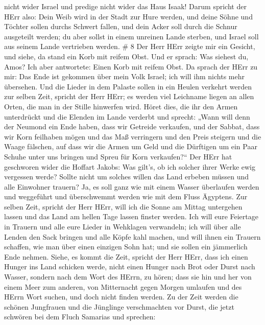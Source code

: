 nicht wider Israel und predige nicht wider das Haus Isaak! 
Darum spricht der HErr also: Dein Weib wird in der Stadt zur Hure
werden, und deine Söhne und Töchter sollen durchs Schwert fallen, und
dein Acker soll durch die Schnur ausgeteilt werden; du aber sollst in
einem unreinen Lande sterben, und Israel soll aus seinem Lande
vertrieben werden. \# 8  Der Herr HErr zeigte mir ein
Gesicht, und siehe, da stand ein Korb mit reifem Obst.  Und
er sprach: Was siehest du, Amos? Ich aber antwortete: Einen Korb mit
reifem Obst. Da sprach der HErr zu mir: Das Ende ist gekommen über mein
Volk Israel; ich will ihm nichts mehr übersehen.  Und die
Lieder in dem Palaste sollen in ein Heulen verkehrt werden zur selben
Zeit, spricht der Herr HErr; es werden viel Leichname liegen an allen
Orten, die man in der Stille hinwerfen wird.  Höret dies,
die ihr den Armen unterdrückt und die Elenden im Lande verderbt
 und sprecht: „Wann will denn der Neumond ein Ende haben,
dass wir Getreide verkaufen, und der Sabbat, dass wir Korn feilhaben
mögen und das Maß verringern und den Preis steigern und die Waage
fälschen,  auf dass wir die Armen um Geld und die Dürftigen
um ein Paar Schuhe unter uns bringen und Spreu für Korn verkaufen?{}``
 Der HErr hat geschworen wider die Hoffart Jakobs: Was
gilt's, ob ich solcher ihrer Werke ewig vergessen werde? 
Sollte nicht um solches willen das Land erbeben müssen und alle
Einwohner trauern? Ja, es soll ganz wie mit einem Wasser überlaufen
werden und weggeführt und überschwemmt werden wie mit dem Fluss
Ägyptens.  Zur selben Zeit, spricht der Herr HErr, will ich
die Sonne am Mittag untergehen lassen und das Land am hellen Tage lassen
finster werden.  Ich will eure Feiertage in Trauern und
alle eure Lieder in Wehklagen verwandeln; ich will über alle Lenden den
Sack bringen und alle Köpfe kahl machen, und will ihnen ein Trauern
schaffen, wie man über einen einzigen Sohn hat; und sie sollen ein
jämmerlich Ende nehmen.  Siehe, es kommt die Zeit, spricht
der Herr HErr, dass ich einen Hunger ins Land schicken werde, nicht
einen Hunger nach Brot oder Durst nach Wasser, sondern nach dem Wort des
HErrn, zu hören;  dass sie hin und her von einem Meer zum
anderen, von Mitternacht gegen Morgen umlaufen und des HErrn Wort
suchen, und doch nicht finden werden.  Zu der Zeit werden
die schönen Jungfrauen und die Jünglinge verschmachten vor Durst,
 die jetzt schwören bei dem Fluch Samarias und sprechen:
